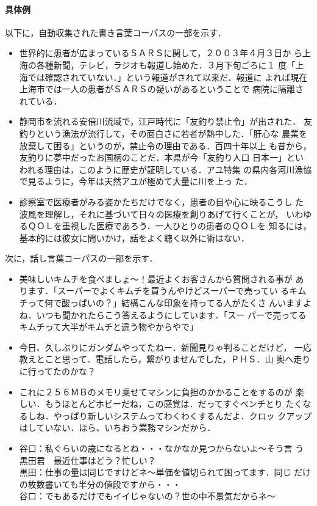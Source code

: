 \documentclass{nlp}
\begin{document}
\paragraph{具体例}
以下に，自動収集された書き言葉コーパスの一部を示す．
\begin{itemize}
 \item 世界的に患者が広まっているＳＡＲＳに関して，２００３年４月３日か
       ら上海の各種新聞，テレビ，ラジオも報道し始めた．３月下旬ごろに１
       度「上海では確認されていない．」という報道がされて以来だ．報道に
       よれば現在上海市では一人の患者がＳＡＲＳの疑いがあるということで
       病院に隔離されている．
       
 \item 静岡市を流れる安倍川流域で，江戸時代に「友釣り禁止令」が出された．
       友釣りという漁法が流行して，その面白さに若者が熱中した．「肝心な
       農業を放棄して困る」というのが，禁止令の理由である．百四十年以上
       も昔から，友釣りに夢中だったお国柄のことだ．本県が今「友釣り人口
       日本一」といわれる理由は，このように歴史が証明している．アユ特集
       の県内各河川漁協で見るように，今年は天然アユが極めて大量に川を上っ
       た．

 \item 診察室で医療者がみる姿かたちだけでなく，患者の目や心に映るこうし
       た波風を理解し，それに基づいて日々の医療を創りあげて行くことが，
       いわゆるＱＯＬを重視した医療であろう．一人ひとりの患者のＱＯＬを
       知るには，基本的には彼女に問いかけ，話をよく聴く以外に術はない．
\end{itemize}
次に，話し言葉コーパスの一部を示す．
\begin{itemize}
 \item 美味しいキムチを食べましょ〜！最近よくお客さんから質問される事が
       あります．「スーパーでよくキムチを買うんやけどスーパーで売ってい
       るキムチって何で酸っぱいの？」結構こんな印象を持ってる人がたくさ
       んいますよね．いつも聞かれたらこう答えるようにしています．「スー
       パーで売ってるキムチって大半がキムチと違う物やからやで」

 \item 今日、久しぶりにガンダムやってたねー．新聞見りゃ判ることだけど，
       一応教えとこと思って．電話したら，繋がりませんでした，ＰＨＳ．山
       奥へ走りに行ってたのかな？

 \item これに２５６ＭＢのメモリ乗せてマシンに負担のかかることをするのが
       楽しい．もうほとんどホビーだね，この感覚は．だってすぐベンチとり
       たくなるしね．やっぱり新しいシステムってわくわくするんだよ．クロッ
       クアップはしていない．ほら、いちおう業務マシンだから．
       
 \item 谷口：私ぐらいの歳になるとね・・・なかなか見つからないよ〜そう言
       う黒田君　最近仕事はどう？忙しい？\\
       黒田：仕事の量は同じですけどネ〜単価を値切られて困ってます．同じ
       だけの枚数書いても半分の値段ですから・・・\\
       谷口：でもあるだけでもイイじゃないの？世の中不景気だからネ〜
\end{itemize}
\end{document}
